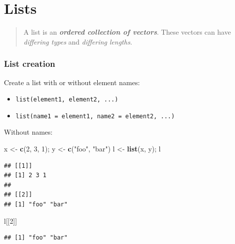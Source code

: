 \documentclass[]{book}
\newenvironment{Shaded}{\begin{snugshade}}{\end{snugshade}}
\newcommand{\DecValTok}[1]{\textcolor[rgb]{0.00,0.00,0.81}{#1}}
\newcommand{\KeywordTok}[1]{\textcolor[rgb]{0.13,0.29,0.53}{\textbf{#1}}}
\newcommand{\NormalTok}[1]{#1}
\newcommand{\StringTok}[1]{\textcolor[rgb]{0.31,0.60,0.02}{#1}}
\providecommand{\tightlist}{%
  \setlength{\itemsep}{0pt}\setlength{\parskip}{0pt}}
\begin{document}
\hypertarget{lists}{%
\section{Lists}\label{lists}}

\begin{quote}
A list is an \textbf{\emph{ordered collection of vectors}}. These vectors can have \emph{differing types} and \emph{differing lengths}.
\end{quote}

\hypertarget{list-creation}{%
\subsubsection*{List creation}\label{list-creation}}

Create a list with or without element names:

\begin{itemize}
\tightlist
\item
  \texttt{list(element1,\ element2,\ ...)}~\\
\item
  \texttt{list(name1\ =\ element1,\ name2\ =\ element2,\ ...)}
\end{itemize}

Without names:

\begin{Shaded}
\begin{Highlighting}[]
\NormalTok{x <-}\StringTok{ }\KeywordTok{c}\NormalTok{(}\DecValTok{2}\NormalTok{, }\DecValTok{3}\NormalTok{, }\DecValTok{1}\NormalTok{);  y <-}\StringTok{ }\KeywordTok{c}\NormalTok{(}\StringTok{"foo"}\NormalTok{, }\StringTok{"bar"}\NormalTok{)}
\NormalTok{l <-}\StringTok{ }\KeywordTok{list}\NormalTok{(x, y); l}
\end{Highlighting}
\end{Shaded}

\begin{verbatim}
## [[1]]
## [1] 2 3 1
## 
## [[2]]
## [1] "foo" "bar"
\end{verbatim}

\begin{Shaded}
\begin{Highlighting}[]
\NormalTok{l[[}\DecValTok{2}\NormalTok{]]}
\end{Highlighting}
\end{Shaded}

\begin{verbatim}
## [1] "foo" "bar"
\end{verbatim}
\end{document}
